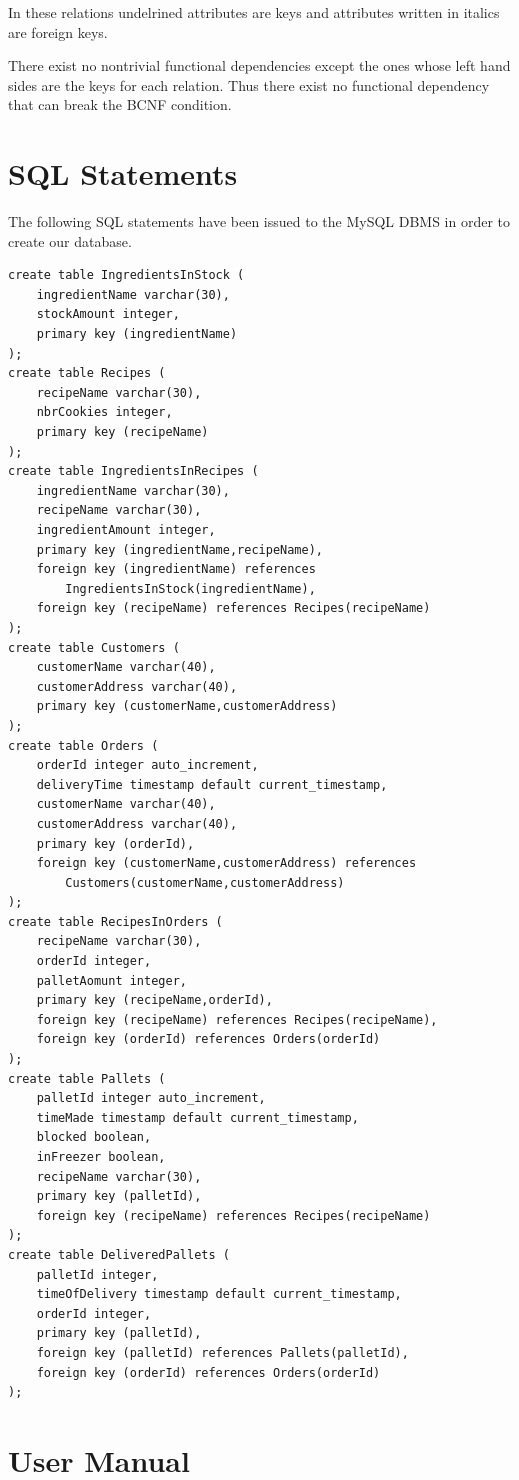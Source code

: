 \documentclass[a4paper]{article}
\begin{document}
In these relations undelrined attributes are keys and attributes written in italics are foreign keys.

There exist no nontrivial functional dependencies except the ones whose left hand sides are the keys for each relation. Thus there exist no functional dependency that can break the BCNF condition.

\section{SQL Statements}
The following SQL statements have been issued to the MySQL DBMS in order to create our database.
\begin{Verbatim}
create table IngredientsInStock (
	ingredientName varchar(30),
	stockAmount integer,
	primary key (ingredientName)
);
create table Recipes (
	recipeName varchar(30),
	nbrCookies integer,
	primary key (recipeName)
);
create table IngredientsInRecipes (
	ingredientName varchar(30),
	recipeName varchar(30),
	ingredientAmount integer,
	primary key (ingredientName,recipeName),
	foreign key (ingredientName) references 
		IngredientsInStock(ingredientName),
	foreign key (recipeName) references Recipes(recipeName)
);
create table Customers (
	customerName varchar(40),
	customerAddress varchar(40),
	primary key (customerName,customerAddress)
);
create table Orders (
	orderId integer auto_increment,
	deliveryTime timestamp default current_timestamp,
	customerName varchar(40),
	customerAddress varchar(40),
	primary key (orderId),
	foreign key (customerName,customerAddress) references 
		Customers(customerName,customerAddress)
);
create table RecipesInOrders (
	recipeName varchar(30),
	orderId integer,
	palletAomunt integer,
	primary key (recipeName,orderId),
	foreign key (recipeName) references Recipes(recipeName),
	foreign key (orderId) references Orders(orderId)
);
create table Pallets (
	palletId integer auto_increment,
	timeMade timestamp default current_timestamp,
	blocked boolean,
	inFreezer boolean,
	recipeName varchar(30),
	primary key (palletId),
	foreign key (recipeName) references Recipes(recipeName)
);
create table DeliveredPallets (
	palletId integer,
	timeOfDelivery timestamp default current_timestamp,
	orderId integer,
	primary key (palletId),
	foreign key (palletId) references Pallets(palletId),
	foreign key (orderId) references Orders(orderId)
);
\end{Verbatim}

\section{User Manual}
\end{document}
